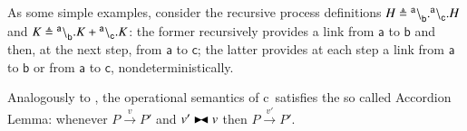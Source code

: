\begin{example}
As some simple examples, consider the recursive process definitions $H \triangleq {}^{\mathsf{a}} \backslash_{\mathsf{b}}^{}.{}^{\mathsf{a}} \backslash_{\mathsf{c}}^{}.H$ and $K \triangleq {}^{\mathsf{a}} \backslash_{\mathsf{b}}^{}.K + {}^{\mathsf{a}} \backslash_{\mathsf{c}}^{}.K$: the former recursively provides a link from $\mathsf{a}$ to $\mathsf{b}$ and then, at the next step, from $\mathsf{a}$ to $\mathsf{c}$; the latter provides at each step a link from $\mathsf{a}$ to $\mathsf{b}$ or from $\mathsf{a}$ to $\mathsf{c}$, nondeterministically. 
\end{example}

Analogously to \CNA, the operational semantics of c\CNA\ satisfies the so called Accordion Lemma: whenever $P \xrightarrow{v} P'$ and $v'\blackstretcheq v$ then $P \xrightarrow{v'} P'$.


